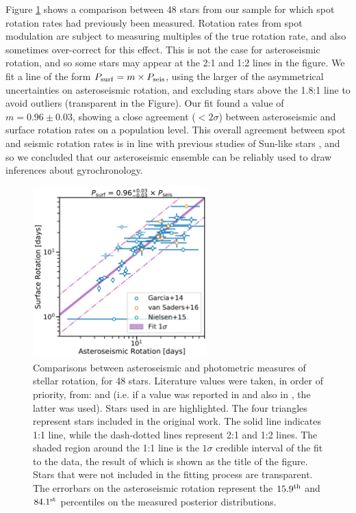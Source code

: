 \documentclass[12pt]{article}
\begin{document}
Figure \ref{fig:protlit} shows a comparison between 48 stars from our sample for which spot  rotation rates had previously been measured. Rotation rates from spot modulation are subject to measuring multiples of the true rotation rate, and also sometimes over-correct for this effect. This is not the case for asteroseismic rotation, and so some stars may appear at the 2:1 and 1:2 lines in the figure. We fit a line of the form $P_{\rm surf} = m \times P_{\rm seis}$, using the larger of the asymmetrical uncertainties on asteroseismic rotation, and excluding stars above the 1.8:1 line to avoid outliers (transparent in the Figure). Our fit found a value of $m = 0.96 \pm 0.03$, showing a close agreement ($<2\sigma$) between asteroseismic and surface rotation rates on a population level. 
This overall agreement between spot and seismic rotation rates is in line with previous studies of Sun-like stars \cite{gizon+2013, chaplin+2013, nielsen+2015, benomar+2015}, and so we concluded that our asteroseismic ensemble can be reliably used to draw inferences about gyrochronology.\\

\begin{figure}
	\centering
	\includegraphics[width=0.6\textwidth]{Images/surf-seis-comparison.pdf}
	\caption{Comparisons between asteroseismic and photometric measures of stellar rotation, for 48 stars. Literature values were taken, in order of priority, from: \cite{garcia+2014} and \cite{nielsen+2013} (i.e. if a value was reported in \cite{nielsen+2013} and also in \cite{garcia+2014}, the latter was used). Stars used in \cite{vansaders+2016} are highlighted. The four triangles represent stars included in the original \cite{nielsen+2015} work. The solid line indicates 1:1 line, while the dash-dotted lines represent 2:1 and 1:2 lines. The shaded region around the 1:1 line is the $1\sigma$ credible interval of the fit to the data, the result of which is shown as the title of the figure. Stars that were not included in the fitting process are transparent. The errorbars on the asteroseismic rotation represent the $15.9^{\rm th}$ and $84.1^{\rm st}$ percentiles on the measured posterior distributions.}
	\label{fig:protlit}
\end{figure}
\end{document}

